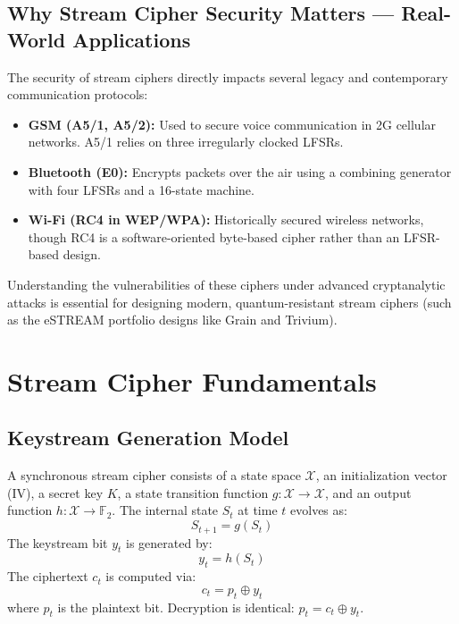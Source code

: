 \subsection{Why Stream Cipher Security Matters — Real-World Applications}
The security of stream ciphers directly impacts several legacy and contemporary communication protocols:
\begin{itemize}
    \item \textbf{GSM (A5/1, A5/2):} Used to secure voice communication in 2G cellular networks. A5/1 relies on three irregularly clocked LFSRs.
    \item \textbf{Bluetooth (E0):} Encrypts packets over the air using a combining generator with four LFSRs and a 16-state machine.
    \item \textbf{Wi-Fi (RC4 in WEP/WPA):} Historically secured wireless networks, though RC4 is a software-oriented byte-based cipher rather than an LFSR-based design.
\end{itemize}
Understanding the vulnerabilities of these ciphers under advanced cryptanalytic attacks is essential for designing modern, quantum-resistant stream ciphers (such as the eSTREAM portfolio designs like Grain and Trivium).

\section{Stream Cipher Fundamentals}
\label{sec:stream_fundamentals}

\subsection{Keystream Generation Model}
A synchronous stream cipher consists of a state space $\mathcal{X}$, an initialization vector (IV), a secret key $K$, a state transition function $g: \mathcal{X} \to \mathcal{X}$, and an output function $h: \mathcal{X} \to \mathbb{F}_2$. The internal state $S_t$ at time $t$ evolves as:
$$S_{t+1} = g(S_t)$$
The keystream bit $y_t$ is generated by:
$$y_t = h(S_t)$$
The ciphertext $c_t$ is computed via:
$$c_t = p_t \oplus y_t$$
where $p_t$ is the plaintext bit. Decryption is identical: $p_t = c_t \oplus y_t$.


